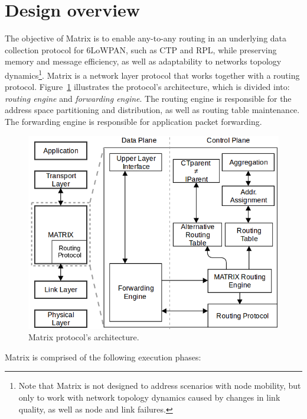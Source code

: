 \section{Design overview}
\label{sec:matrix}


The objective of Matrix is to enable any-to-any routing in an
underlying data collection protocol for 6LoWPAN, such as CTP and
RPL, while preserving memory and message efficiency, as well as
adaptability to networks topology dynamics\footnote{Note that Matrix
is not designed to address scenarios with node mobility, but only to
work with network topology dynamics caused by changes in link
quality, as well as node and link failures.}. Matrix is a network
layer protocol that works together with a routing protocol.
Figure~\ref{fig:architecture} illustrates the protocol's
architecture, which is divided into: \textit{routing engine} and
\textit{forwarding engine}. The routing engine is responsible for
the address space partitioning and distribution, as well as routing
table maintenance. The forwarding engine is responsible for
application packet forwarding.

\begin{figure}[!ht]
    \centering
    \includegraphics[width=1\columnwidth]{./Images/Architecture.png}
\caption{Matrix protocol's architecture.}
    \label{fig:architecture}
\end{figure}

Matrix is comprised of the following execution phases:
 
